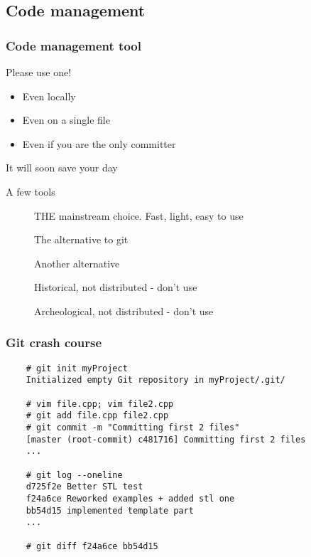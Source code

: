 \subsection[VCS]{Code management}

\begin{frame}[fragile]
  \frametitle{Code management tool}
  \begin{alertblock}{Please use one!}
    \begin{itemize}
    \item Even locally
    \item Even on a single file
    \item Even if you are the only committer
    \end{itemize}
    It will soon save your day
  \end{alertblock}
  \begin{block}{A few tools}
    \begin{description}
    \item[\href{http://git-scm.com/}{}]
      THE mainstream choice. Fast, light, easy to use
    \item[\href{http://mercurial.selenic.com/}{}]
      The alternative to git
    \item[\href{http://bazaar.canonical.com/en/}{}]
      Another alternative
    \item[\href{https://subversion.apache.org/}{}]
      Historical, not distributed - don't use
    \item[\href{https://cvs.nongnu.org/}{}]
      Archeological, not distributed - don't use
    \end{description}
  \end{block}
\end{frame}

\begin{frame}[fragile]
  \frametitle{Git crash course}
  \begin{verbatim}
    # git init myProject
    Initialized empty Git repository in myProject/.git/

    # vim file.cpp; vim file2.cpp
    # git add file.cpp file2.cpp
    # git commit -m "Committing first 2 files"
    [master (root-commit) c481716] Committing first 2 files
    ...

    # git log --oneline
    d725f2e Better STL test
    f24a6ce Reworked examples + added stl one
    bb54d15 implemented template part
    ...

    # git diff f24a6ce bb54d15
  \end{verbatim}
\end{frame}

